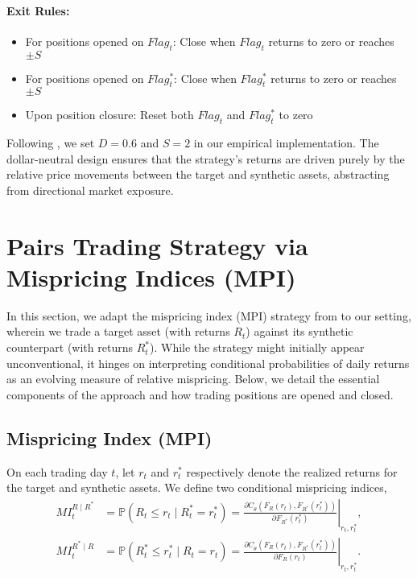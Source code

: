 \paragraph{Exit Rules:}
\begin{itemize}
\item For positions opened on $Flag_t$: Close when $Flag_t$ returns to zero or reaches $\pm S$
\item For positions opened on $Flag_t^*$: Close when $Flag_t^*$ returns to zero or reaches $\pm S$
\item Upon position closure: Reset both $Flag_t$ and $Flag_t^*$ to zero
\end{itemize}

Following \cite{xie2016}, we set $D = 0.6$ and $S = 2$ in our empirical implementation. The dollar-neutral design ensures that the strategy's returns are driven purely by the relative price movements between the target and synthetic assets, abstracting from directional market exposure. 


\section{Pairs Trading Strategy via Mispricing Indices (MPI)} \label{sec:mpi_strategy}

In this section, we adapt the mispricing index (MPI) strategy from \cite{xie2016mpi} to our setting, wherein we trade a target asset (with returns $R_t$) against its synthetic counterpart (with returns $R_t^*$). While the strategy might initially appear unconventional, it hinges on interpreting conditional probabilities of daily returns as an evolving measure of relative mispricing. Below, we detail the essential components of the approach and how trading positions are opened and closed.

\subsection{Mispricing Index (MPI)}

On each trading day $t$, let $r_t$ and $r_t^*$ respectively denote the realized returns for the target and synthetic assets. We define two conditional mispricing indices,
\begin{align*}
MI_t^{R \mid R^*} 
&= \mathbb{P}(R_t \leq r_t \mid R_t^* = r_t^*)
= \left.\frac{\partial C_{\hat{\theta}}(F_R(r_t), F_{R^*}(r_t^*))}{\partial F_{R^*}(r_t^*)}\right|_{r_t,r_t^*}
,
\\[0.4em]
MI_t^{R^* \mid R} 
&= \mathbb{P}(R_t^* \leq r_t^* \mid R_t = r_t)
= \left.\frac{\partial C_{\hat{\theta}}(F_R(r_t), F_{R^*}(r_t^*))}{\partial F_R(r_t)}\right|_{r_t,r_t^*}
.
\end{align*}

